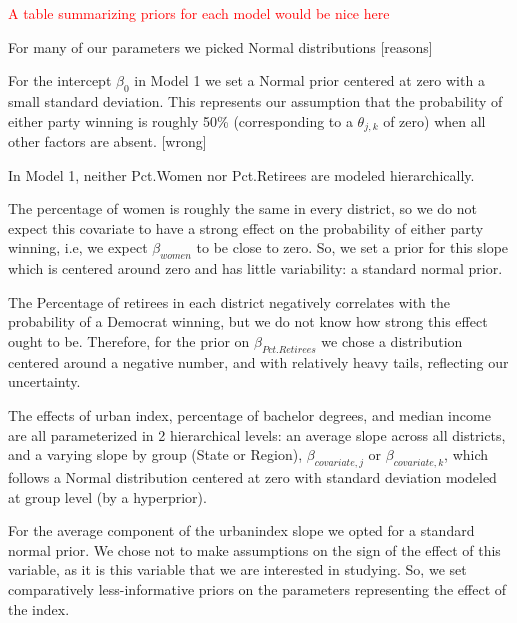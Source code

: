 \documentclass[12pt]{article}
\begin{document}
\textcolor{red}{A table summarizing priors for each model would be nice here}


%
%
%
%
%
%
%




For many of our parameters we picked Normal distributions [reasons]

For the intercept $\beta_0$ in Model 1 we set a Normal prior centered at zero with a small standard deviation. This represents our assumption that the probability of either party winning is roughly 50\% (corresponding to a $\theta_{j,k}$ of zero) when all other factors are absent. [wrong]



In Model 1, neither Pct.Women nor Pct.Retirees are modeled hierarchically. 


The percentage of women is roughly the same in every district, so we do not expect this covariate to have a strong effect on the probability of either party winning, i.e, we expect $\beta_{women}$ to be close to zero. So, we set a prior for this slope which is centered around zero and has little variability: a standard normal prior. 

The Percentage of retirees in each district negatively correlates with the probability of a Democrat winning, but we do not know how strong this effect ought to be. Therefore, for the prior on $\beta_{Pct.Retirees}$ we chose a distribution centered around a negative number, and with relatively heavy tails, reflecting our uncertainty. 



The effects of urban index, percentage of bachelor degrees, and median income are all parameterized in 2 hierarchical levels: an average slope across all districts, and a varying slope by group (State or Region), $\beta_{covariate,j}$ or $\beta_{covariate,k}$, which follows a Normal distribution centered at zero with standard deviation modeled at group level (by a hyperprior).

 
For the average component of the urbanindex slope we opted for a standard normal prior. We chose not to make assumptions on the sign of the effect of this variable, as it is this variable that we are interested in studying. So, we set comparatively less-informative priors on the parameters representing the effect of the index.
\end{document}
